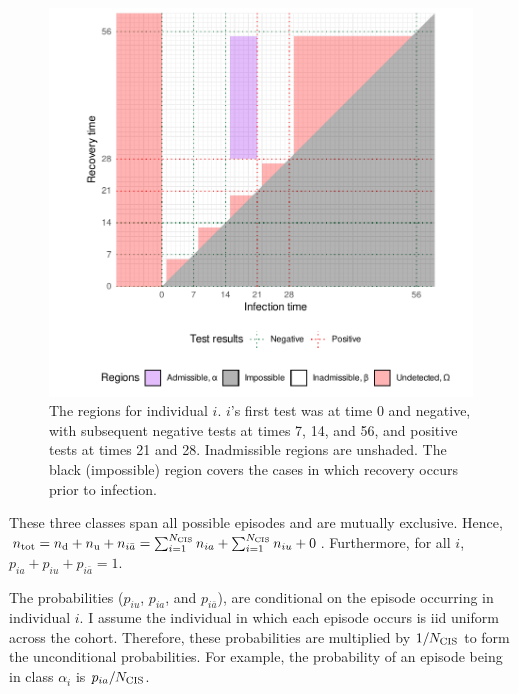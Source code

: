 \documentclass[thesis.tex]{subfiles}
\begin{document}
\begin{figure}
\includegraphics[width=\textwidth]{cis-perfect-testing/regions_diag}
\caption[Admissible, inadmissible, and undetected regions]{%
  The regions for individual $i$.
  $i$'s first test was at time 0 and negative, with subsequent negative tests at times 7, 14, and 56, and positive tests at times 21 and 28.
  Inadmissible regions are unshaded.
  The black (impossible) region covers the cases in which recovery occurs prior to infection.
  \label{perf-test:fig:partitionSpace}
}
\end{figure}

These three classes span all possible episodes and are mutually exclusive.
Hence, $n_\text{tot} = n_\text{d} + n_\text{u} + n_{i\bar{a}} = \sum_{i=1}^{N_\text{CIS}} n_{ia} + \sum_{i=1}^{N_\text{CIS}} n_{iu} + 0$.
Furthermore, for all $i$, $p_{ia} + p_{iu} + p_{i\bar{a}} = 1$.

The probabilities ($p_{iu}$, $p_{ia}$, and $p_{i\bar{a}}$), are conditional on the episode occurring in individual $i$.
I assume the individual in which each episode occurs is iid uniform across the cohort.
Therefore, these probabilities are multiplied by $1/N_\text{CIS}$ to form the unconditional probabilities.
For example, the probability of an episode being in class $\alpha_i$ is $p_{ia} / N_\text{CIS}$.
\end{document}
